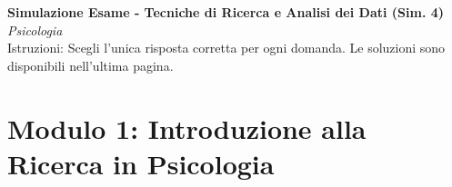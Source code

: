 \documentclass[12pt, a4paper]{article}
\begin{document}
\begin{center}
    \Large\textbf{Simulazione Esame - Tecniche di Ricerca e Analisi dei Dati (Sim. 4)} \\
    \vspace{0.2cm}
    \large\textit{Psicologia} \\
    \vspace{0.5cm}
    \normalsize{Istruzioni: Scegli l'unica risposta corretta per ogni domanda. Le soluzioni sono disponibili nell'ultima pagina.}
\end{center}
\vspace{1cm}

\section*{Modulo 1: Introduzione alla Ricerca in Psicologia}
\end{document}
